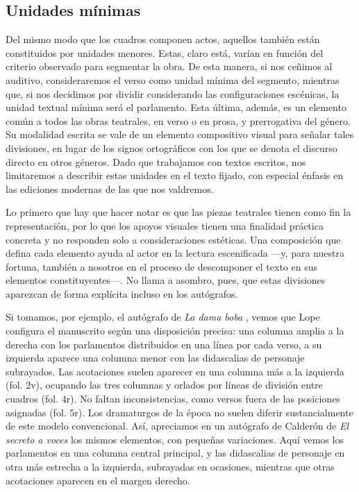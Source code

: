 \subsection{Unidades mínimas}
Del mismo modo que los cuadros componen actos, aquellos también están constituidos por  unidades menores. Estas, claro está, varían en función del criterio observado para segmentar la obra. De esta manera, si nos ceñimos al auditivo, consideraremos el verso como unidad mínima del segmento, mientras que, si nos decidimos por dividir considerando las configuraciones escénicas, la unidad textual mínima será el parlamento. Esta última, además, es un elemento común a todos las obras teatrales, en verso o en prosa, y prerrogativa del género. Su modalidad escrita se vale de un elemento compositivo visual para señalar tales divisiones, en lugar de los signos ortográficos con los que se denota el discurso directo en otros géneros. Dado que trabajamos con textos escritos, nos limitaremos a describir estas unidades en el texto fijado, con especial énfasis en las ediciones modernas de las que nos valdremos.

Lo primero que hay que hacer notar es que las piezas teatrales tienen como fin la representación, por lo que los apoyos visuales  tienen una finalidad práctica concreta y no responden solo a consideraciones estéticas. Una composición que defina cada elemento ayuda al actor en la lectura escenificada —\nolinebreak y, para nuestra fortuna, también a nosotros en el proceso de descomponer el texto en sus elementos constituyentes\nolinebreak[4]—\nolinebreak[4]. No llama a asombro, pues, que estas divisiones aparezcan de forma explícita incluso en los autógrafos.

Si tomamos, por ejemplo, el autógrafo de \textit{La dama boba} \parencite{lope1613}, vemos que Lope  configura el manuscrito según una disposición precisa: una columna amplia a la derecha con los parlamentos distribuidos en una línea por cada verso, a su izquierda aparece una columna menor con las didascalias de personaje subrayados. Las acotaciones suelen aparecer en una columna más a la izquierda (fol. 2v), ocupando las tres columnas y orlados por líneas de división entre cuadros (fol. 4r). No faltan inconsistencias, como versos fuera de las posiciones asignadas (fol. 5r). Los dramaturgos de la época no suelen diferir sustancialmente de este modelo convencional. Así, apreciamos en un autógrafo de Calderón de \textit{El secreto a voces} \parencite{calderon1642} los mismos elementos, con pequeñas variaciones. Aquí vemos los parlamentos en una columna central principal, y las didascalias de personaje en otra más estrecha a la izquierda, subrayadas en ocasiones, mientras que otras acotaciones aparecen en el margen derecho.

